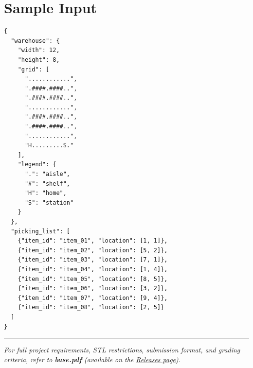 \section{Sample Input}

\begin{lstlisting}[style=json]
{
  "warehouse": {
    "width": 12,
    "height": 8,
    "grid": [
      "............",
      ".####.####..",
      ".####.####..",
      "............",
      ".####.####..",
      ".####.####..",
      "............",
      "H.........S."
    ],
    "legend": {
      ".": "aisle",
      "#": "shelf",
      "H": "home",
      "S": "station"
    }
  },
  "picking_list": [
    {"item_id": "item_01", "location": [1, 1]},
    {"item_id": "item_02", "location": [5, 2]},
    {"item_id": "item_03", "location": [7, 1]},
    {"item_id": "item_04", "location": [1, 4]},
    {"item_id": "item_05", "location": [8, 5]},
    {"item_id": "item_06", "location": [3, 2]},
    {"item_id": "item_07", "location": [9, 4]},
    {"item_id": "item_08", "location": [2, 5]}
  ]
}
\end{lstlisting}

\vfill
\noindent\rule{\textwidth}{0.4pt}
{\small\textit{For full project requirements, STL restrictions, submission format, and grading criteria, refer to \textbf{base.pdf} (available on the \href{https://github.com/BestSithInEU/cse211-term-projects/releases}{Releases page}).}}

